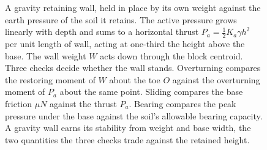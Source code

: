 \begin{figure}[htbp]
\caption[Gravity retaining wall and its three stability checks]{A gravity
retaining wall, held in place by its own weight against the earth pressure
of the soil it retains. The active pressure grows linearly with depth and
sums to a horizontal thrust $P_a=\tfrac12 K_a \gamma h^2$ per unit length
of wall, acting at one-third the height above the base. The wall weight $W$
acts down through the block centroid. Three checks decide whether the wall
stands. Overturning compares the restoring moment of $W$ about the toe $O$
against the overturning moment of $P_a$ about the same point. Sliding
compares the base friction $\mu N$ against the thrust $P_a$. Bearing
compares the peak pressure under the base against the soil's allowable
bearing capacity. A gravity wall earns its stability from weight and base
width, the two quantities the three checks trade against the retained
height.}
\label{fig:vol03ch02:retaining-wall}
\end{figure}
